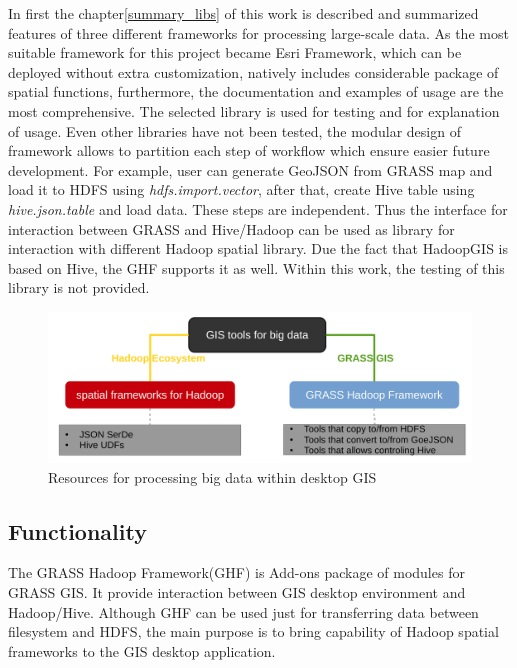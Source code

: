 \documentclass[a4paper,12pt,oneside]{report}
\begin{document}
    In first the chapter\ref{summary_libs} of this work is described and
    summarized features of three different frameworks for processing large-scale
    data.     As the most suitable framework for this project became Esri Framework, which
    can be deployed without extra customization, natively includes considerable
    package of spatial functions, furthermore, the documentation  and examples of
    usage are  the most comprehensive. The selected library is used for testing
    and for explanation of usage. Even other libraries have
    not been tested, the modular design of framework allows to partition each step
    of workflow which ensure easier future development. For example,
    user can generate GeoJSON from GRASS map and load it to HDFS using
    \textit{hdfs.import.vector}, after that, create Hive table using
    \textit{hive.json.table} and load data. These steps are independent.
    Thus the interface for interaction between GRASS and
    Hive/Hadoop can be used as library for interaction with different Hadoop spatial library.
    Due the fact that HadoopGIS is based on Hive, the GHF supports it as well. 
    Within this work, the testing of this library is not provided.

	
	\begin{figure}[!htbp]
		\centering
		\includegraphics[width=1\textwidth]{./img/idea_schema.pdf}
		\caption[Resources]{\centering Resources for processing big data within
			desktop GIS}
	\end{figure} 
	
	
	\subsection{Functionality}
    The GRASS Hadoop Framework(GHF) is Add-ons package of modules
    for GRASS GIS. It provide interaction between GIS desktop environment and
    Hadoop/Hive. Although GHF can be used just for transferring data between filesystem
    and HDFS, the main purpose is to bring capability of Hadoop spatial
    frameworks  to the GIS desktop application. 
    
\end{document}

